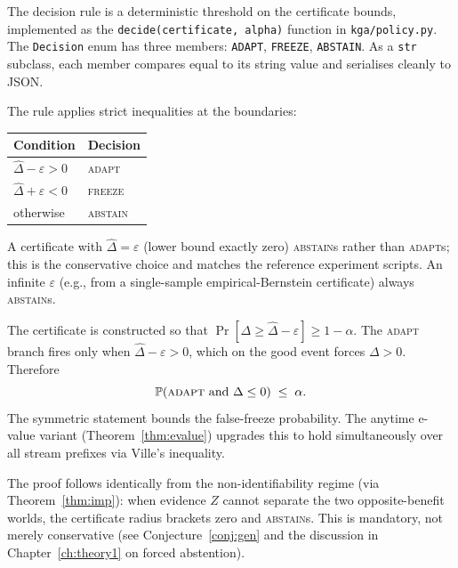 The decision rule is a deterministic threshold on the certificate bounds,
implemented as the \texttt{decide(certificate, alpha)} function in
\texttt{kga/policy.py}.  The \texttt{Decision} enum has three members:
\texttt{ADAPT}, \texttt{FREEZE}, \texttt{ABSTAIN}.  As a \texttt{str} subclass,
each member compares equal to its string value and serialises cleanly to JSON.

The rule applies strict inequalities at the boundaries:

\begin{center}
\begin{tabular}{ll}
\toprule
Condition & Decision \\
\midrule
$\widehat\Delta - \varepsilon > 0$ & \textsc{adapt} \\
$\widehat\Delta + \varepsilon < 0$ & \textsc{freeze} \\
otherwise & \textsc{abstain} \\
\bottomrule
\end{tabular}
\end{center}

A certificate with $\widehat\Delta = \varepsilon$ (lower bound exactly zero)
\textsc{abstain}s rather than \textsc{adapt}s; this is the conservative choice
and matches the reference experiment scripts.  An infinite $\varepsilon$
(e.g., from a single-sample empirical-Bernstein certificate) always
\textsc{abstain}s.

\begin{theorem}
  \label{thm:kga-false-adapt}
  The certificate is constructed so that $\Pr[\Delta \geq \widehat\Delta -
  \varepsilon] \geq 1 - \alpha$.  The \textsc{adapt} branch fires only when
  $\widehat\Delta - \varepsilon > 0$, which on the good event forces $\Delta >
  0$.  Therefore
  \[
    \Pr\!\left(\text{\textsc{adapt}} \text{ and } \Delta \leq 0\right) \;\leq\;
    \alpha.
  \]
  The symmetric statement bounds the false-freeze probability.  The anytime
  e-value variant (Theorem~\ref{thm:evalue}) upgrades this to hold
  simultaneously over all stream prefixes via Ville's inequality.
\end{theorem}

The proof follows identically from the non-identifiability regime (via
Theorem~\ref{thm:imp}): when evidence $Z$ cannot separate the two opposite-benefit
worlds, the certificate radius brackets zero and \KGA{} \textsc{abstain}s.  This
is mandatory, not merely conservative (see Conjecture~\ref{conj:gen} and the
discussion in Chapter~\ref{ch:theory1} on forced abstention).

